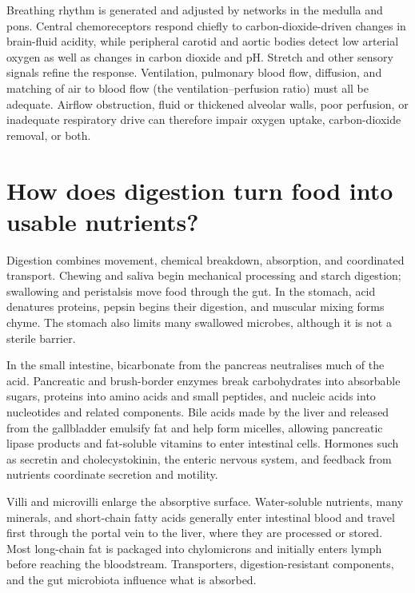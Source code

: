 \documentclass[11pt,oneside]{report}
\begin{document}
Breathing rhythm is generated and adjusted by networks in the medulla and pons.
Central chemoreceptors respond chiefly to carbon-dioxide-driven changes in
brain-fluid acidity, while peripheral carotid and aortic bodies detect low
arterial oxygen as well as changes in carbon dioxide and pH. Stretch and other
sensory signals refine the response. Ventilation, pulmonary blood flow,
diffusion, and matching of air to blood flow (the ventilation--perfusion ratio)
must all be adequate. Airflow obstruction, fluid or thickened alveolar walls,
poor perfusion, or inadequate respiratory drive can therefore impair oxygen
uptake, carbon-dioxide removal, or both.

\section{How does digestion turn food into usable nutrients?}

Digestion combines movement, chemical breakdown, absorption, and coordinated
transport. Chewing and saliva begin mechanical processing and starch digestion;
swallowing and peristalsis move food through the gut. In the stomach, acid
denatures proteins, pepsin begins their digestion, and muscular mixing forms
chyme. The stomach also limits many swallowed microbes, although it is not a
sterile barrier.

In the small intestine, bicarbonate from the pancreas neutralises much of the
acid. Pancreatic and brush-border enzymes break carbohydrates into absorbable
sugars, proteins into amino acids and small peptides, and nucleic acids into
nucleotides and related components. Bile acids made by the liver and released
from the gallbladder emulsify fat and help form micelles, allowing pancreatic
lipase products and fat-soluble vitamins to enter intestinal cells. Hormones
such as secretin and cholecystokinin, the enteric nervous system, and feedback
from nutrients coordinate secretion and motility.

Villi and microvilli enlarge the absorptive surface. Water-soluble nutrients,
many minerals, and short-chain fatty acids generally enter intestinal blood and
travel first through the portal vein to the liver, where they are processed or
stored. Most long-chain fat is packaged into chylomicrons and initially enters
lymph before reaching the bloodstream. Transporters, digestion-resistant
components, and the gut microbiota influence what is absorbed.
\end{document}
